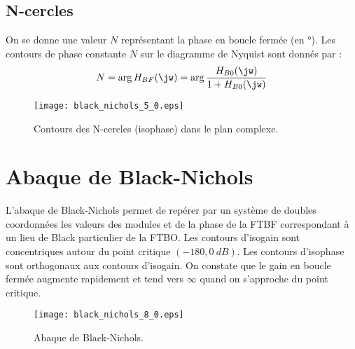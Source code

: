 \subsection{N-cercles}
On se donne une valeur $N$ représentant la phase en boucle fermée 
(en \si{\degree}). Les contours de phase constante $N$ sur le diagramme 
de Nyquist sont donnés par :
\[
    N=\arg{H_{BF}(\jw)}=\arg{\dfrac{H_{B0}(\jw)}{1+H_{B0}(\jw)}}
\]
\begin{figure}[!h]
    \begin{center}
        \texttt{[image: black\_nichols\_5\_0.eps]}
    \end{center}
    \caption{Contours des N-cercles (isophase) dans le plan complexe.}
\end{figure}
\clearpage
\section{Abaque de Black-Nichols}
L'abaque de Black-Nichols permet de repérer par un système de doubles 
coordonnées les valeurs des modules et de la phase de la FTBF correspondant à 
un lieu de Black particulier de la FTBO. Les contours d'isogain sont 
concentriques autour du point critique $(-180,\SI{0}{dB})$. Les contours 
d'isophase sont orthogonaux aux contours d'isogain.
On constate que le gain en boucle fermée augmente rapidement et tend vers 
$\infty$ quand on s'approche du point critique.
\begin{figure}[!h]
\begin{center}
    \texttt{[image: black\_nichols\_8\_0.eps]}
\end{center}
    \caption{Abaque de Black-Nichols.}
\end{figure}
\clearpage
